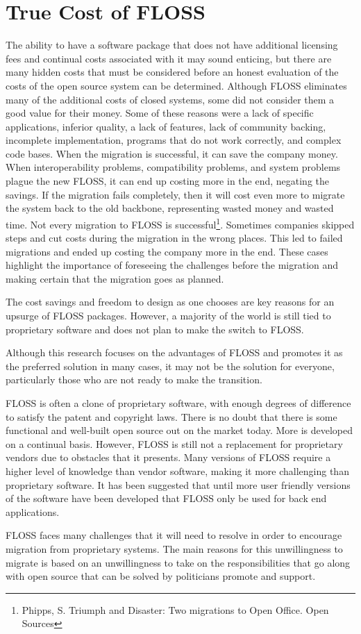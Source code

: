  \section{True Cost of FLOSS}
 The ability to have a software package that does not have additional licensing fees and continual costs associated with it may sound enticing, but there are many hidden costs that must be considered before an honest evaluation of the costs of the open source system can be determined. Although FLOSS eliminates many of the additional costs of closed systems, some did not consider them a good value for their money. Some of these reasons were a lack of specific applications, inferior quality, a lack of features, lack of community backing, incomplete implementation, programs that do not work correctly, and complex code bases.
 When the migration is successful, it can save the company money. When interoperability problems, compatibility problems, and system problems plague the new FLOSS, it can end up costing more in the end, negating the savings. If the migration fails completely, then it will cost even more to migrate the system back to the old backbone, representing wasted money and wasted time. Not every migration to FLOSS is successful\footnote{Phipps, S. Triumph and Disaster: Two migrations to Open Office. Open Sources}. Sometimes companies skipped steps and cut costs during the migration in the wrong places. This led to failed migrations and ended up costing the company more in the end. These cases highlight the importance of foreseeing the challenges before the migration and making certain that the migration goes as planned. 
 
 The cost savings and freedom to design as one chooses are key reasons for an upsurge of FLOSS packages. However, a majority of the world is still tied to proprietary software and does not plan to make the switch to FLOSS. 
 

 
 Although this research focuses on the advantages of FLOSS  and promotes it as the preferred solution in many cases, it may not be the solution for everyone, particularly those who are not ready to make the transition. 
 
 FLOSS is often a clone of proprietary software, with enough degrees of difference to satisfy the patent and copyright laws. There is no doubt that there is some functional and well-built open source out on the market today. More is developed on a continual basis. However, FLOSS is still not a replacement for proprietary vendors due to obstacles that it presents. Many versions of FLOSS require a higher level of knowledge than vendor software, making it more challenging than proprietary software. It has been suggested that until more user friendly versions of the software have been developed that FLOSS only be used for back end applications.

 FLOSS faces many challenges that it will need to resolve in order to encourage migration from proprietary systems. 
  The main reasons for this unwillingness to migrate is based on an unwillingness to take on the responsibilities that go along with open source that can be solved by politicians promote and support.
  
  
